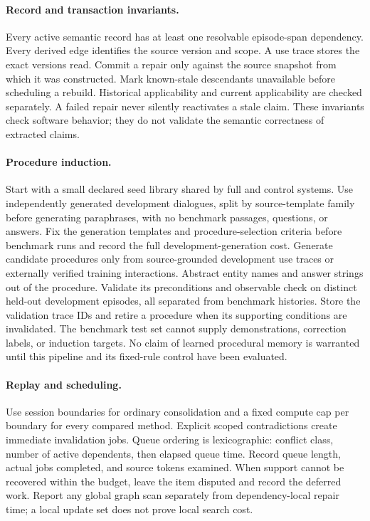 \documentclass{article}
\begin{document}
\paragraph{Record and transaction invariants.}
Every active semantic record has at least one resolvable episode-span
dependency. Every derived edge identifies the source version and scope.
A use trace stores the exact versions read. Commit a repair only against the
source snapshot from which it was constructed. Mark known-stale descendants
unavailable before scheduling a rebuild. Historical applicability and
current applicability are checked separately. A failed repair never silently
reactivates a stale claim. These invariants check software behavior; they do
not validate the semantic correctness of extracted claims.

\paragraph{Procedure induction.}
Start with a small declared seed library shared by full and control systems.
Use independently generated development dialogues, split by source-template
family before generating paraphrases, with no benchmark passages, questions,
or answers. Fix the generation templates and procedure-selection criteria
before benchmark runs and record the full development-generation cost.
Generate candidate procedures only from source-grounded development use
traces or externally verified training interactions. Abstract entity names
and answer strings out of the procedure. Validate its preconditions and
observable check on distinct held-out development episodes, all separated
from benchmark histories. Store the validation trace IDs and retire a
procedure when its supporting conditions are invalidated. The benchmark
test set cannot supply demonstrations, correction labels, or induction
targets. No claim of learned procedural memory is warranted until this
pipeline and its fixed-rule control have been evaluated.

\paragraph{Replay and scheduling.}
Use session boundaries for ordinary consolidation and a fixed compute cap
per boundary for every compared method. Explicit scoped contradictions
create immediate invalidation jobs. Queue ordering is lexicographic:
conflict class, number of active dependents, then elapsed queue time.
Record queue length, actual jobs completed, and source tokens examined.
When support cannot be recovered within the budget, leave the item disputed
and record the deferred work. Report any global graph scan separately from
dependency-local repair time; a local update set does not prove local search
cost.
\end{document}
